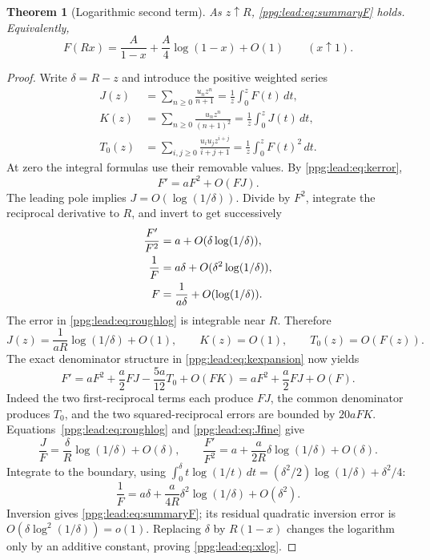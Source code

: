 \documentclass[11pt,letterpaper]{article}
\newtheorem{theorem}{Theorem}[section]
\theoremstyle{remark}\newtheorem{remark}[theorem]{Remark}
\numberwithin{equation}{section}
\begin{document}
\begin{theorem}[Logarithmic second term]\label{ppg:lead:thm:log}
As $z\uparrow R$, \eqref{ppg:lead:eq:summaryF} holds. Equivalently,
\begin{equation}\label{ppg:lead:eq:xlog}
 F(Rx)=\frac A{1-x}+\frac A4\log(1-x)+O(1)\qquad(x\uparrow1).
\end{equation}
\end{theorem}
\begin{proof}
Write $\delta=R-z$ and introduce the positive weighted series
\begin{align*}
 J(z)&=\sum_{n\ge0}\frac{u_nz^n}{n+1}=\frac1z\int_0^zF(t)\,dt,\\
 K(z)&=\sum_{n\ge0}\frac{u_nz^n}{(n+1)^2}=\frac1z\int_0^zJ(t)\,dt,\\
 T_0(z)&=\sum_{i,j\ge0}\frac{u_iu_jz^{i+j}}{i+j+1}
         =\frac1z\int_0^zF(t)^2\,dt.
\end{align*}
At zero the integral formulas use their removable values. By \eqref{ppg:lead:eq:kerror},
\[
 F'=aF^2+O(FJ).
\]
The leading pole implies $J=O(\log(1/\delta))$. Divide by $F^2$, integrate the reciprocal derivative to $R$, and invert to get successively
\begin{align}
 \frac{F'}{F^2}&=a+O(\delta\log(1/\delta)),\notag\\
 \frac1F&=a\delta+O(\delta^2\log(1/\delta)),\notag\\
 F&=\frac1{a\delta}+O(\log(1/\delta)).\label{ppg:lead:eq:roughlog}
\end{align}
The error in \eqref{ppg:lead:eq:roughlog} is integrable near $R$. Therefore
\begin{equation}\label{ppg:lead:eq:Jfine}
 J(z)=\frac1{aR}\log(1/\delta)+O(1),\qquad K(z)=O(1),\qquad T_0(z)=O(F(z)).
\end{equation}
The exact denominator structure in \eqref{ppg:lead:eq:kexpansion} now yields
\begin{equation}\label{ppg:lead:eq:refinedDE}
 F'=aF^2+\frac a2FJ-\frac{5a}{12}T_0+O(FK)
    =aF^2+\frac a2FJ+O(F).
\end{equation}
Indeed the two first-reciprocal terms each produce $FJ$, the common denominator produces $T_0$, and the two squared-reciprocal errors are bounded by $20aFK$.
Equations~\eqref{ppg:lead:eq:roughlog} and \eqref{ppg:lead:eq:Jfine} give
\[
 \frac JF=\frac\delta R\log(1/\delta)+O(\delta),\qquad
 \frac{F'}{F^2}=a+\frac a{2R}\delta\log(1/\delta)+O(\delta).
\]
Integrate to the boundary, using
$\int_0^\delta t\log(1/t)\,dt=(\delta^2/2)\log(1/\delta)+\delta^2/4$:
\[
 \frac1F=a\delta+\frac a{4R}\delta^2\log(1/\delta)+O(\delta^2).
\]
Inversion gives \eqref{ppg:lead:eq:summaryF}; its residual quadratic inversion error is $O(\delta\log^2(1/\delta))=o(1)$. Replacing $\delta$ by $R(1-x)$ changes the logarithm only by an additive constant, proving \eqref{ppg:lead:eq:xlog}.
\end{proof}
\end{document}
